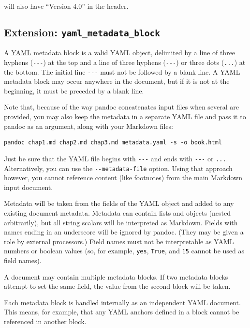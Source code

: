 \documentclass[
  b5paper
]{book}
\begin{document}
will also have ``Version 4.0'' in the header.

\subsection{\texorpdfstring{Extension:
\texttt{yaml\_metadata\_block}}{Extension: yaml\_metadata\_block}}\label{extension-yaml_metadata_block}

A \href{https://yaml.org/spec/1.2/spec.html}{YAML} metadata block is a
valid YAML object, delimited by a line of three hyphens
(\texttt{-\/-\/-}) at the top and a line of three hyphens
(\texttt{-\/-\/-}) or three dots (\texttt{...}) at the bottom. The
initial line \texttt{-\/-\/-} must not be followed by a blank line. A
YAML metadata block may occur anywhere in the document, but if it is not
at the beginning, it must be preceded by a blank line.

Note that, because of the way pandoc concatenates input files when
several are provided, you may also keep the metadata in a separate YAML
file and pass it to pandoc as an argument, along with your Markdown
files:

\begin{verbatim}
pandoc chap1.md chap2.md chap3.md metadata.yaml -s -o book.html
\end{verbatim}

Just be sure that the YAML file begins with \texttt{-\/-\/-} and ends
with \texttt{-\/-\/-} or \texttt{...}. Alternatively, you can use the
\texttt{-\/-metadata-file} option. Using that approach however, you
cannot reference content (like footnotes) from the main Markdown input
document.

Metadata will be taken from the fields of the YAML object and added to
any existing document metadata. Metadata can contain lists and objects
(nested arbitrarily), but all string scalars will be interpreted as
Markdown. Fields with names ending in an underscore will be ignored by
pandoc. (They may be given a role by external processors.) Field names
must not be interpretable as YAML numbers or boolean values (so, for
example, \texttt{yes}, \texttt{True}, and \texttt{15} cannot be used as
field names).

A document may contain multiple metadata blocks. If two metadata blocks
attempt to set the same field, the value from the second block will be
taken.

Each metadata block is handled internally as an independent YAML
document. This means, for example, that any YAML anchors defined in a
block cannot be referenced in another block.
\end{document}
